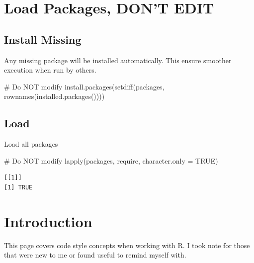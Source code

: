 \documentclass[
  letterpaper,
  DIV=11,
  numbers=noendperiod]{scrreprt}
\newenvironment{Shaded}{\begin{snugshade}}{\end{snugshade}}
\newcommand{\AttributeTok}[1]{\textcolor[rgb]{0.40,0.45,0.13}{#1}}
\newcommand{\CommentTok}[1]{\textcolor[rgb]{0.37,0.37,0.37}{#1}}
\newcommand{\ConstantTok}[1]{\textcolor[rgb]{0.56,0.35,0.01}{#1}}
\newcommand{\FunctionTok}[1]{\textcolor[rgb]{0.28,0.35,0.67}{#1}}
\newcommand{\NormalTok}[1]{\textcolor[rgb]{0.00,0.23,0.31}{#1}}
\begin{document}
\section*{Load Packages, DON'T EDIT}\label{sec-packages}


\subsection*{Install Missing}\label{install-missing-6}

Any missing package will be installed automatically. This ensure
smoother execution when run by others.

\begin{Shaded}
\begin{Highlighting}[]
\CommentTok{\# Do NOT modify}
\FunctionTok{install.packages}\NormalTok{(}\FunctionTok{setdiff}\NormalTok{(packages, }\FunctionTok{rownames}\NormalTok{(}\FunctionTok{installed.packages}\NormalTok{())))}
\end{Highlighting}
\end{Shaded}

\subsection*{Load}\label{load-6}

Load all packages

\begin{Shaded}
\begin{Highlighting}[]
\CommentTok{\# Do NOT modify}
\FunctionTok{lapply}\NormalTok{(packages, require, }\AttributeTok{character.only =} \ConstantTok{TRUE}\NormalTok{)}
\end{Highlighting}
\end{Shaded}

\begin{verbatim}
[[1]]
[1] TRUE
\end{verbatim}

\section{Introduction}\label{introduction-3}

This page covers code style concepts when working with R. I took note
for those that were new to me or found useful to remind myself with.
\end{document}
